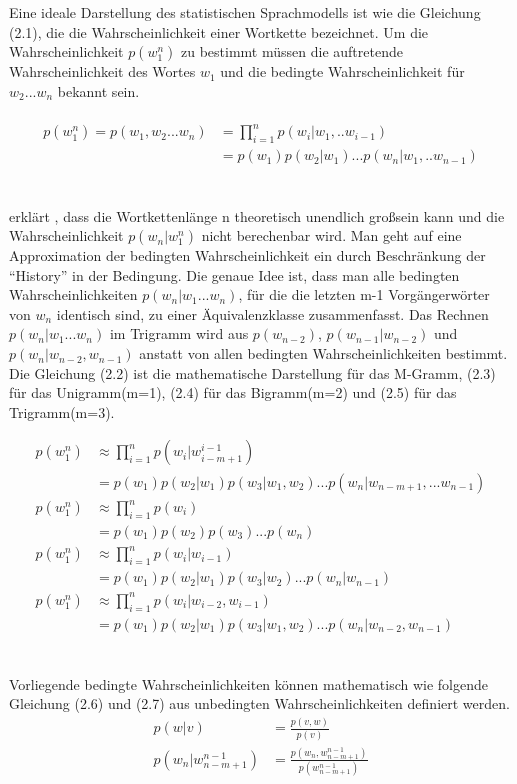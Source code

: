 Eine ideale Darstellung des statistischen Sprachmodells ist wie die Gleichung (2.1), die die Wahrscheinlichkeit einer Wortkette bezeichnet. Um die Wahrscheinlichkeit $p(w_{1}^n)$ zu bestimmt m\"ussen die auftretende Wahrscheinlichkeit des Wortes $w_{1}$ und die bedingte Wahrscheinlichkeit f\"ur $w_{2}...w_{n}$ bekannt sein.
\\
\\
\begin{align}
p(w_{1}^n) = p(w_{1},w_{2}...w_{n}) &= \prod_{i=1}^n p(w_{i}|w_{1},..w_{i-1}) \nonumber\\
&= p(w_{1})p(w_{2}|w_{1})...p(w_{n}|w_{1},..w_{n-1})
\end{align}
\\
\\
\cite{book_speech} erkl\"art , dass die Wortkettenl\"ange n theoretisch unendlich gro\ss  sein kann und die Wahrscheinlichkeit $p(w_{n}|w_{1}^n)$ nicht berechenbar wird. Man geht auf eine Approximation der bedingten Wahrscheinlichkeit ein durch Beschr\"ankung der "`History"' in der Bedingung. Die genaue Idee ist, dass man alle bedingten Wahrscheinlichkeiten $p(w_{n}|w_{1}...w_{n})$, f\"ur die die letzten m-1 Vorg\"angerw\"orter von $w_{n}$ identisch sind, zu einer \"Aquivalenzklasse zusammenfasst. Das Rechnen $p(w_{n}|w_{1}...w_{n})$ im Trigramm wird aus $p(w_{n-2})$, $p(w_{n-1}|w_{n-2})$ und $p(w_{n}|w_{n-2},w_{n-1})$ anstatt von allen bedingten Wahrscheinlichkeiten bestimmt. 
Die Gleichung (2.2) ist die mathematische Darstellung f\"ur das M-Gramm, (2.3) f\"ur das Unigramm(m=1), (2.4) f\"ur das Bigramm(m=2) und (2.5) f\"ur das Trigramm(m=3).

\begin{align}
p(w_{1}^n) & \approx \prod_{i=1}^n p(w_{i}|w_{i-m+1}^{i-1})\nonumber \\
					 &=p(w_{1})p(w_{2}|w_{1})p(w_{3}|w_{1},w_{2})...p(w_{n}|w_{n-m+1},...w_{n-1})\\
p(w_{1}^n) & \approx \prod_{i=1}^n p(w_{i})\nonumber \\
					 &=p(w_{1})p(w_{2})p(w_{3})...p(w_{n})\\	
p(w_{1}^n) & \approx \prod_{i=1}^n p(w_{i}|w_{i-1})\nonumber \\
					 &=p(w_{1})p(w_{2}|w_{1})p(w_{3}|w_{2})...p(w_{n}|w_{n-1}) \\				 
p(w_{1}^n) & \approx \prod_{i=1}^n p(w_{i}|w_{i-2},w_{i-1})\nonumber \\
					 &=p(w_{1})p(w_{2}|w_{1})p(w_{3}|w_{1},w_{2})...p(w_{n}|w_{n-2},w_{n-1})
\end{align}
\\
\\
Vorliegende bedingte Wahrscheinlichkeiten k\"onnen mathematisch wie folgende Gleichung (2.6) und (2.7)  aus unbedingten Wahrscheinlichkeiten definiert werden.
\begin{align}
p(w|v) &=\frac{p(v,w)}{p(v)} \\
p(w_{n}|w_{n-m+1}^{n-1}) &=\frac{p(w_{n},w_{n-m+1}^{n-1} )}{p(w_{n-m+1}^{n-1})} 
\end{align}

